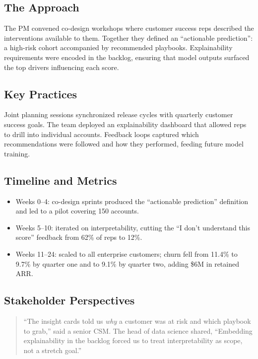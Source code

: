\subsection{The Approach}
The PM convened co-design workshops where customer success reps described the interventions available to them. Together they defined an ``actionable prediction'': a high-risk cohort accompanied by recommended playbooks. Explainability requirements were encoded in the backlog, ensuring that model outputs surfaced the top drivers influencing each score.

\subsection{Key Practices}
Joint planning sessions synchronized release cycles with quarterly customer success goals. The team deployed an explainability dashboard that allowed reps to drill into individual accounts. Feedback loops captured which recommendations were followed and how they performed, feeding future model training.

\subsection{Timeline and Metrics}
\begin{itemize}
    \item Weeks 0--4: co-design sprints produced the ``actionable prediction'' definition and led to a pilot covering 150 accounts.
    \item Weeks 5--10: iterated on interpretability, cutting the ``I don't understand this score'' feedback from 62\% of reps to 12\%.
    \item Weeks 11--24: scaled to all enterprise customers; churn fell from 11.4\% to 9.7\% by quarter one and to 9.1\% by quarter two, adding \$6M in retained ARR.
\end{itemize}

\subsection{Stakeholder Perspectives}
\begin{quote}
``The insight cards told us \emph{why} a customer was at risk and which playbook to grab,'' said a senior CSM. The head of data science shared, ``Embedding explainability in the backlog forced us to treat interpretability as scope, not a stretch goal.''
\end{quote}

